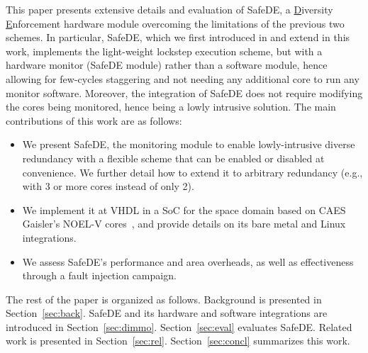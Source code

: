 This paper presents extensive details and evaluation of SafeDE, a \underline{D}iversity \underline{E}nforcement hardware module overcoming the limitations of the previous two schemes. In particular, SafeDE, which we first introduced in \cite{SafeDE} and extend in this work, implements the light-weight lockstep execution scheme, but with a hardware monitor (SafeDE module) rather than a software module, hence allowing for few-cycles staggering and not needing any additional core to run any monitor software. Moreover, the integration of SafeDE does not require modifying the cores being monitored, hence being a lowly intrusive solution.
The main contributions of this work are as follows:
\begin{itemize}
\item We present SafeDE, the monitoring module to enable lowly-intrusive diverse redundancy with a flexible scheme that can be enabled or disabled at convenience. We further detail how to extend it to arbitrary redundancy (e.g., with 3 or more cores instead of only 2).
\item We implement it at VHDL in a SoC for the space domain based on CAES Gaisler's NOEL-V cores~\cite{SELENEgit}, and provide details on its bare metal and Linux integrations.
\item We assess SafeDE's performance and area overheads, as well as effectiveness through a fault injection campaign.
\end{itemize}

The rest of the paper is organized as follows. Background is presented in Section~\ref{sec:back}. SafeDE and its hardware and software integrations are introduced in Section~\ref{sec:dimmo}. Section~\ref{sec:eval} evaluates SafeDE. Related work is presented in Section~\ref{sec:rel}. Section~\ref{sec:concl} summarizes this work.
